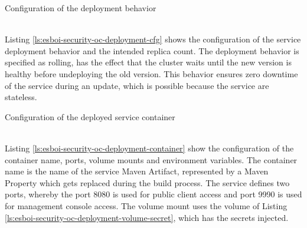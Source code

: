 
\begin{listing}
	\caption{Configuration of the deployment behavior}
	\label{ls:esboi-security-oc-deployment-cfg}
\end{listing}
\ \\
Listing \vref{ls:esboi-security-oc-deployment-cfg} shows the configuration of the service deployment behavior and the intended replica count. The deployment behavior is specified as rolling, has the effect that the cluster waits until the new version is healthy before undeploying the old version. This behavior ensures zero downtime of the service during an update, which is possible because the service are stateless.

\begin{listing}
	\caption{Configuration of the deployed service container}
	\label{ls:esboi-security-oc-deployment-container}
\end{listing}
\ \\
Listing \vref{ls:esboi-security-oc-deployment-container} show the configuration of the container name, ports, volume mounts and environment variables. The container name is the name of the service Maven Artifact, represented by a Maven Property which gets replaced during the build process. The service defines two ports, whereby the port 8080 is used for public client access and port 9990 is used for management console access. The volume mount uses the volume of Listing \vref{ls:esboi-security-oc-deployment-volume-secret}, which has the secrets injected.